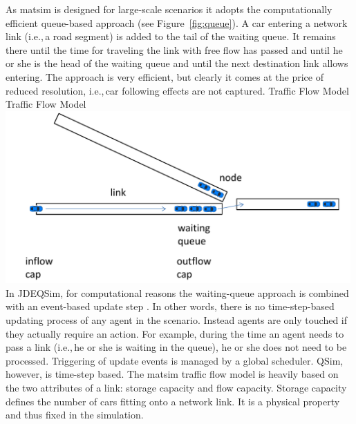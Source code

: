As \gls{matsim} is designed for large-scale \glspl{scenario} it adopts the computationally efficient queue-based approach (see Figure~\ref{fig:queue}). A car entering a network link (i.e.,\,a road segment) is added to the tail of the waiting queue. It remains there until the time for traveling the link with free flow has passed and until he or she is the head of the waiting queue and until the next destination link allows entering. The approach is very efficient, but clearly it comes at the price of reduced resolution, i.e.,\,car following effects are not captured.   
%
\createfigure%
{Traffic Flow Model}%
{Traffic Flow Model}%
{\label{fig:queue}}%
{\includegraphics[width=0.99\textwidth, angle=0]{using/figures/queue.pdf}}%
{}
%
In JDEQSim, for computational reasons the waiting-queue approach is combined with an event-based update step \citep[][]{CharyparEtAl_TRB_2009}. In other words, there is no time-step-based updating process of any agent in the scenario. Instead agents are only touched if they actually require an action. For example, during the time an agent needs to pass a link (i.e.,\,he or she is waiting in the queue), he or she does not need to be processed.  
%
Triggering of update events is managed by a global scheduler. QSim, however, is time-step based. 
%
%
%
The \gls{matsim} traffic flow model is heavily based on the two attributes of a link: storage capacity and flow capacity. Storage capacity defines the number of cars fitting onto a network link. It is a physical property and thus fixed in the simulation. 

